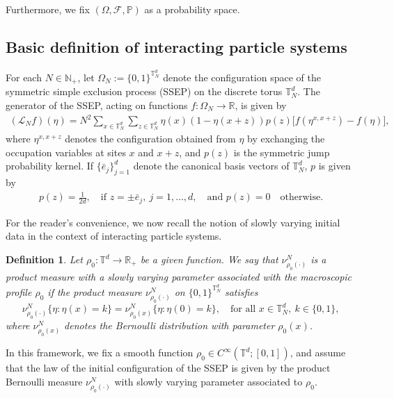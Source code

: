 \documentclass[UTF-8,reqno]{amsart}
\numberwithin{equation}{section}
\newtheorem{definition}[theorem]{Definition}
\begin{document}
Furthermore, we fix $(\Omega,\mathcal{F},\mathbb{P})$ as a probability space. 




\subsection{Basic definition of interacting particle systems} 
For each $N \in \mathbb{N}_+$, let $\Omega_N := \{0,1\}^{\mathbb{T}^d_N}$ denote the configuration space of the symmetric simple exclusion process (SSEP) on the discrete torus $\mathbb{T}^d_N$. The generator of the SSEP, acting on functions $f: \Omega_N \to \mathbb{R}$, is given by
\begin{align*}
(\mathcal{L}_N f)(\eta) = N^2 \sum_{x \in \mathbb{T}^d_N} \sum_{z \in \mathbb{T}^d_N} \eta(x)(1 - \eta(x+z)) p(z) \big[f(\eta^{x,x+z}) - f(\eta)\big],
\end{align*}
where $\eta^{x,x+z}$ denotes the configuration obtained from $\eta$ by exchanging the occupation variables at sites $x$ and $x+z$, and $p(z)$ is the symmetric jump probability kernel. If $\{\bar{e}_j\}_{j=1}^d$ denote the canonical basis vectors of $\mathbb{T}^d_N$, $p$ is given by 
\begin{align*}
p(z) = \frac{1}{2d}, \quad \text{if } z = \pm \bar{e}_j,\ j = 1, \ldots, d, \quad \text{and } p(z) = 0 \quad \text{otherwise}.
\end{align*} 


For the reader's convenience, we now recall the notion of slowly varying initial data in the context of interacting particle systems.

\begin{definition}\label{def-initialdata}
Let $\rho_0: \mathbb{T}^d \to \mathbb{R}_+$ be a given function. We say that $\nu^N_{\rho_0(\cdot)}$ is a product measure with a slowly varying parameter associated with the macroscopic profile $\rho_0$ if the product measure $\nu^N_{\rho_0(\cdot)}$ on $\{0,1\}^{\mathbb{T}^d_N}$ satisfies
$$
\nu^N_{\rho_0(\cdot)} \bigl\{ \eta : \eta(x) = k \bigr\} = \nu^N_{\rho_0(x)} \bigl\{ \eta : \eta(0) = k \bigr\}, \quad \text{for all } x \in \mathbb{T}^d_N, \ k \in \{0,1\},
$$
where $\nu^N_{\rho_0(x)}$ denotes the Bernoulli distribution with parameter $\rho_0(x)$.

\end{definition}

In this framework, we fix a smooth function $\rho_0 \in C^{\infty}(\mathbb{T}^d;[0,1])$, and assume that the law of the initial configuration of the SSEP is given by the product Bernoulli measure $\nu^N_{\rho_0(\cdot)}$ with slowly varying parameter associated to $\rho_0$. 
\end{document}
